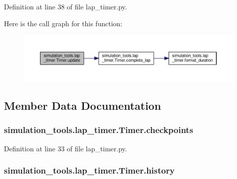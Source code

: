 Definition at line 38 of file lap\+\_\+timer.\+py.



Here is the call graph for this function\+:
\nopagebreak
\begin{figure}[H]
\begin{center}
\leavevmode
\includegraphics[width=350pt]{classsimulation__tools_1_1lap__timer_1_1_timer_ae9b21a99e315e66e34311c6b9feeb0e8_cgraph}
\end{center}
\end{figure}




\subsection{Member Data Documentation}
\subsubsection[{\texorpdfstring{checkpoints}{checkpoints}}]{\setlength{\rightskip}{0pt plus 5cm}simulation\+\_\+tools.\+lap\+\_\+timer.\+Timer.\+checkpoints}\hypertarget{classsimulation__tools_1_1lap__timer_1_1_timer_ae042ce601347d175584be16d8166a74e}{}\label{classsimulation__tools_1_1lap__timer_1_1_timer_ae042ce601347d175584be16d8166a74e}


Definition at line 33 of file lap\+\_\+timer.\+py.

\subsubsection[{\texorpdfstring{history}{history}}]{\setlength{\rightskip}{0pt plus 5cm}simulation\+\_\+tools.\+lap\+\_\+timer.\+Timer.\+history}\hypertarget{classsimulation__tools_1_1lap__timer_1_1_timer_a5f5e50dc374ab88c05748ab49392b881}{}\label{classsimulation__tools_1_1lap__timer_1_1_timer_a5f5e50dc374ab88c05748ab49392b881}


